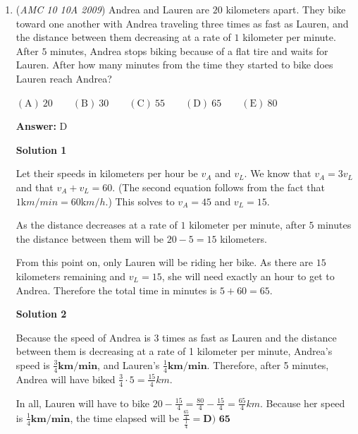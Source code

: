 \begin{enumerate}
 \begin{verbatim}
*The number of factors of $a^x \cdot b^y \cdot c^z \cdots$ and so on, where $a, b, c, \dots$ are distinct prime numbers, is $(x+1)(y+1)(z+1)...$.
\end{verbatim}




	\item (\textit{AMC 10 10A 2009}) Andrea and Lauren are $20$ kilometers apart. They bike toward one another with Andrea traveling three times as fast as Lauren, and the distance between them decreasing at a rate of $1$ kilometer per minute. After $5$ minutes, Andrea stops biking because of a flat tire and waits for Lauren. After how many minutes from the time they started to bike does Lauren reach Andrea?


 $\mathrm{(A)}\ 20 \qquad \mathrm{(B)}\ 30 \qquad \mathrm{(C)}\ 55 \qquad \mathrm{(D)}\ 65 \qquad \mathrm{(E)}\ 80$

 \textbf{Answer: }D



\textbf{Solution 1}

Let their speeds in kilometers per hour be $v_A$ and $v_L$. We know that $v_A=3v_L$ and that $v_A+v_L=60$. (The second equation follows from the fact that $1\mathrm km/min = 60\mathrm km/h$.) This solves to $v_A=45$ and $v_L=15$. 

 As the distance decreases at a rate of $1$ kilometer per minute, after $5$ minutes the distance between them will be $20-5=15$ kilometers.

 From this point on, only Lauren will be riding her bike. As there are $15$ kilometers remaining and $v_L=15$, she will need exactly an hour to get to Andrea. Therefore the total time in minutes is $5+60 = \boxed{65}$.

 



\textbf{Solution 2}

Because the speed of Andrea is 3 times as fast as Lauren and the distance between them is decreasing at a rate of 1 kilometer per minute, Andrea's speed is $\frac{3}{4} \textbf{km/min}$, and Lauren's $\frac{1}{4} \textbf{km/min}$. Therefore, after 5 minutes, Andrea will have biked $\frac{3}{4} \cdot 5 = \frac{15}{4}km$.

 In all, Lauren will have to bike $20 - \frac{15}{4} = \frac{80}{4} - \frac{15}{4} = \frac{65}{4}km$. Because her speed is $\frac{1}{4} \textbf{km/min}$, the time elapsed will be $\frac{\frac{65}{4}}{\frac{1}{4}} = \boxed{\textbf{D) 65}}$





\end{enumerate}
